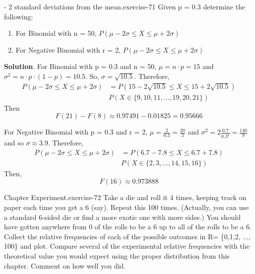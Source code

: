 \documentclass[10pt,]{book}
\numberwithin{equation}{section}
\begin{document}
\begin{inlineexercise}{- 2 standard deviations from the mean.}{exercise-71}%
\hypertarget{p-1027}{}%
Given p = 0.3 determine the following: \leavevmode%
\begin{enumerate}
\item\hypertarget{li-288}{}For Binomial with n = 50, \(P(\mu - 2\sigma \le X \le \mu + 2\sigma)\)%
\item\hypertarget{li-289}{}For Negative Binomial with r = 2, \(P(\mu - 2\sigma \le X \le \mu + 2\sigma)\)%
\end{enumerate}
%
\textbf{Solution}.\quad%
\hypertarget{p-1028}{}%
For Binomial with p = 0.3 and n = 50, \(\mu = n \cdot p = 15\) and \(\sigma^2 = n \cdot p \cdot (1-p) = 10.5\).  So, \(\sigma = \sqrt{10.5}\).  Therefore,%
\begin{align*}
P(\mu - 2\sigma \le X \le \mu + 2\sigma) & = P(15 - 2 \sqrt{10.5} \le X \le 15 + 2 \sqrt{10.5})\\
& P( X \in \{9, 10, 11, ... , 19, 20, 21 \} )
\end{align*}
Then%
\begin{equation*}
F(21) - F(8) \approx 0.97491 - 0.01825 = 0.95666 
\end{equation*}
%
\par
\hypertarget{p-1029}{}%
For Negative Binomial with p = 0.3 and r = 2, \(\mu = \frac{2}{0.3} = \frac{20}{3}\) and \(\sigma^2 = 2 \frac{0.7}{0.3^2} = \frac{140}{9}\) and so \(\sigma \approx 3.9\).  Therefore,%
\begin{align*}
P(\mu - 2\sigma \le X \le \mu + 2\sigma) & = P(6.7 - 7.8 \le X \le 6.7 + 7.8)\\
& P( X \in \{2, 3, ... , 14, 15, 16 \} )
\end{align*}
Then,%
\begin{equation*}
F(16) \approx 0.973888
\end{equation*}
%
\end{inlineexercise}
%
\par
\hypertarget{p-1030}{}%
\begin{inlineexercise}{Chapter Experiment.}{exercise-72}%
\hypertarget{p-1031}{}%
Take a die and roll it 4 times, keeping track on paper each time you get a 6 (say).  Repeat this 100 times. (Actually, you can use a standard 6-sided die or find a more exotic one with more sides.)  You should have gotten anywhere from 0 of the rolls to be a 6 up to all of the rolls to be a 6.  Collect the relative frequencies of each of the possible outcomes in R= \{0,1,2, ..., 100\} and plot.  Compare several of the experimental relative frequencies with the theoretical value you would expect using the proper distribution from this chapter. Comment on how well you did.%
\end{inlineexercise}
%
%
%
\typeout{************************************************}
\typeout{************************************************}
%
\end{document}
